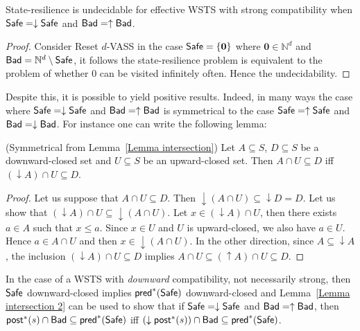 \begin{theorem}\label{srp down up}
{\sc State-resilience} is undecidable for effective WSTS with  strong  compatibility 
when
$\textsf{Safe}=\downarrow \textsf{Safe}$
and $\textsf{Bad}=\uparrow \textsf{Bad}$.
\end{theorem}

\begin{proof}
Consider Reset $d$-VASS
in the case $\textsf{Safe}=\{ \textbf{0} \}$ where  $ \textbf{0} \in \mathbb{N}^d$ 
and $\textsf{Bad} = \mathbb{N}^d \setminus \textsf{Safe}$, 
it follows the state-resilience problem is equivalent 
to the problem of whether $0$ can be visited infinitely often. 
Hence the undecidability.
\end{proof}


Despite this, it is possible to yield positive results. Indeed, in many ways the case where $\textsf{Safe} = \downarrow \textsf{Safe}$ and $\textsf{Bad} = \uparrow \textsf{Bad}$
is symmetrical to the case $\textsf{Safe} = \uparrow \textsf{Safe}$ and $\textsf{Bad} = \downarrow \textsf{Bad}$.
%
For instance one can write the following lemma:

\begin{lemma}(Symmetrical from Lemma~\ref{Lemma intersection})\label{Lemma intersection 2}
Let $A \subseteq S$, $D \subseteq S$ be a downward-closed set and $U \subseteq S$ be an upward-closed set. 
Then $A \cap U \subseteq D$  iff $ (\downarrow  A) \cap U \subseteq D$.
\end{lemma}

\begin{proof}
Let us suppose that $A \cap U \subseteq D$. Then ${\downarrow (A \cap U)} \subseteq {\downarrow D} = D$. Let us show that $({\downarrow A}) \cap U \subseteq {\downarrow (A \cap U)}$. Let $x \in ({\downarrow A}) \cap U$, then there exists $a \in A$ such that $x \leq a$. Since $x \in U$ and $U$ is upward-closed, we also have $a \in U$. Hence $a \in A \cap U$ and then $x \in { \downarrow (A \cap U)}$. In the other direction, since $A \subseteq {\downarrow A}$, the inclusion $({\downarrow  A}) \cap U \subseteq D$ implies $A \cap U \subseteq ({\uparrow  A}) \cap U \subseteq D$.
\end{proof}


In the case of a WSTS with \emph{downward} compatibility, not necessarily strong,
then $\textsf{Safe}$ downward-closed implies $\textsf{pred}^*(\textsf{Safe})$ downward-closed and
Lemma~\ref{Lemma intersection 2} can be used to show that
if $\textsf{Safe} = \downarrow \textsf{Safe}$ and $\textsf{Bad} = \uparrow \textsf{Bad}$,
then
$\textsf{post}^*(s) \cap \textsf{Bad} \subseteq \textsf{pred}^*(\textsf{Safe})$  iff $ (\downarrow  \textsf{post}^*(s)) \cap \textsf{Bad} \subseteq \textsf{pred}^*(\textsf{Safe})$.


